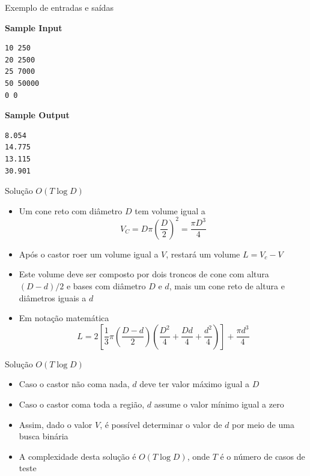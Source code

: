 \begin{frame}[fragile]{Exemplo de entradas e saídas}

\begin{minipage}[t]{0.5\textwidth}
\textbf{Sample Input}
\begin{verbatim}
10 250
20 2500
25 7000
50 50000
0 0
\end{verbatim}
\end{minipage}
\begin{minipage}[t]{0.45\textwidth}
\textbf{Sample Output}
\begin{verbatim}
8.054
14.775
13.115
30.901
\end{verbatim}
\end{minipage}
\end{frame}

\begin{frame}[fragile]{Solução $O(T\log D)$}

    \begin{itemize}
        \item Um cone reto com diâmetro $D$ tem volume igual a
        \[
            V_C = D\pi\left(\frac{D}{2}\right)^2 = \frac{\pi D^3}{4}
        \]

        \item Após o castor roer um volume igual a $V$, restará um volume $L = V_c - V$

        \item Este volume deve ser composto por dois troncos de cone com altura $(D - d)/2$ e 
            bases com diâmetro $D$ e $d$, mais um cone reto de altura e diâmetros iguais a
            $d$

        \item Em notação matemática
        \[
            L = 2\left[\frac{1}{3}\pi\left(\frac{D - d}{2}\right)\left(\frac{D^2}{4} + \frac{Dd}{4} + \frac{d^2}{4}\right)\right] + \frac{\pi d^3}{4}
        \]
    \end{itemize}

\end{frame}

\begin{frame}[fragile]{Solução $O(T\log D)$}

    \begin{itemize}
        \item Caso o castor não coma nada, $d$ deve ter valor máximo igual a $D$

        \item Caso o castor coma toda a região, $d$ assume o valor mínimo igual a zero

        \item Assim, dado o valor $V$, é possível determinar o valor de $d$ por meio de uma
            busca binária

        \item A complexidade desta solução é $O(T\log D)$, onde $T$ é o número de casos de teste

    \end{itemize}

\end{frame}

